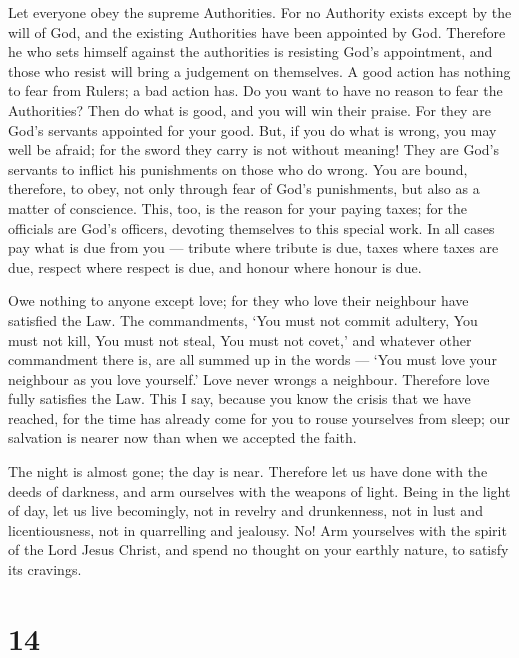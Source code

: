  Let everyone obey the supreme Authorities. For no Authority
exists except by the will of God, and the existing Authorities have been
appointed by God.  Therefore he who sets himself against the
authorities is resisting God's appointment, and those who resist will
bring a judgement on themselves.  A good action has nothing
to fear from Rulers; a bad action has. Do you want to have no reason to
fear the Authorities? Then do what is good, and you will win their
praise.  For they are God's servants appointed for your
good. But, if you do what is wrong, you may well be afraid; for the
sword they carry is not without meaning! They are God's servants to
inflict his punishments on those who do wrong.  You are
bound, therefore, to obey, not only through fear of God's punishments,
but also as a matter of conscience.  This, too, is the
reason for your paying taxes; for the officials are God's officers,
devoting themselves to this special work.  In all cases pay
what is due from you --- tribute where tribute is due, taxes where taxes
are due, respect where respect is due, and honour where honour is due.

 Owe nothing to anyone except love; for they who love their
neighbour have satisfied the Law.  The commandments, `You
must not commit adultery, You must not kill, You must not steal, You
must not covet,' and whatever other commandment there is, are all summed
up in the words --- `You must love your neighbour as you love yourself.'
 Love never wrongs a neighbour. Therefore love fully
satisfies the Law.  This I say, because you know the crisis
that we have reached, for the time has already come for you to rouse
yourselves from sleep; our salvation is nearer now than when we accepted
the faith.

 The night is almost gone; the day is near. Therefore let
us have done with the deeds of darkness, and arm ourselves with the
weapons of light.  Being in the light of day, let us live
becomingly, not in revelry and drunkenness, not in lust and
licentiousness, not in quarrelling and jealousy.  No! Arm
yourselves with the spirit of the Lord Jesus Christ, and spend no
thought on your earthly nature, to satisfy its cravings.

\hypertarget{section-13}{%
\section{14}\label{section-13}}

